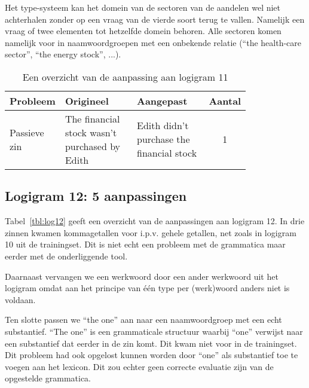 Het type-systeem kan het domein van de sectoren van de aandelen wel niet achterhalen zonder op een vraag van de vierde soort terug te vallen. Namelijk een vraag of twee elementen tot hetzelfde domein behoren. Alle sectoren komen namelijk voor in naamwoordgroepen met een onbekende relatie (``the health-care sector'', ``the energy stock'', ...).

\begin{table}[h]
  \centering
  \begin{tabular}{p{0.2\linewidth}p{0.3\linewidth}p{0.3\linewidth}c}
    \toprule
    \textbf{Probleem} & \textbf{Origineel} & \textbf{Aangepast} & \textbf{Aantal} \\ 
    \hline
    Passieve zin & The financial stock wasn't purchased by Edith & Edith didn't purchase the financial stock & 1\\
    \bottomrule
  \end{tabular}
  \caption{Een overzicht van de aanpassing aan logigram 11}
  \label{tbl:log11}
\end{table}

\subsection{Logigram 12: 5 aanpassingen}
Tabel~\ref{tbl:log12} geeft een overzicht van de aanpassingen aan logigram 12. In drie zinnen kwamen kommagetallen voor i.p.v. gehele getallen, net zoals in logigram 10 uit de trainingset. Dit is niet echt een probleem met de grammatica maar eerder met de onderliggende tool.

Daarnaast vervangen we een werkwoord door een ander werkwoord uit het logigram omdat aan het principe van één type per (werk)woord anders niet is voldaan.

Ten slotte passen we ``the one'' aan naar een naamwoordgroep met een echt substantief. ``The one'' is een grammaticale structuur waarbij ``one'' verwijst naar een substantief dat eerder in de zin komt. Dit kwam niet voor in de trainingset. Dit probleem had ook opgelost kunnen worden door ``one'' als substantief toe te voegen aan het lexicon. Dit zou echter geen correcte evaluatie zijn van de opgestelde grammatica.

